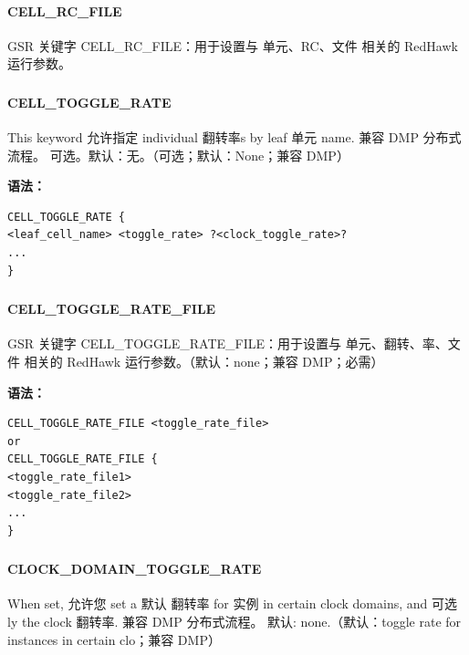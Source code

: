 \paragraph*{CELL_RC_FILE}

GSR 关键字 CELL_RC_FILE：用于设置与 单元、RC、文件 相关的 RedHawk 运行参数。

\subsubsection{}
\paragraph*{CELL_TOGGLE_RATE}

This keyword 允许指定 individual 翻转率s by leaf 单元 name. 兼容 DMP 分布式流程。 可选。默认：无。（可选；默认：None；兼容 DMP）

\textbf{语法：}
\begin{lstlisting}
CELL_TOGGLE_RATE {
<leaf_cell_name> <toggle_rate> ?<clock_toggle_rate>?
...
}
\end{lstlisting}

\subsubsection{}
\paragraph*{CELL_TOGGLE_RATE_FILE}

GSR 关键字 CELL_TOGGLE_RATE_FILE：用于设置与 单元、翻转、率、文件 相关的 RedHawk 运行参数。（默认：none；兼容 DMP；必需）

\textbf{语法：}
\begin{lstlisting}
CELL_TOGGLE_RATE_FILE <toggle_rate_file>
or
CELL_TOGGLE_RATE_FILE {
<toggle_rate_file1>
<toggle_rate_file2>
...
}
\end{lstlisting}

\subsubsection{}
\paragraph*{CLOCK_DOMAIN_TOGGLE_RATE}

When set, 允许您 set a 默认 翻转率 for 实例 in certain clock domains, and 可选ly the clock 翻转率. 兼容 DMP 分布式流程。 默认: none.（默认：toggle rate for instances in certain clo；兼容 DMP）

